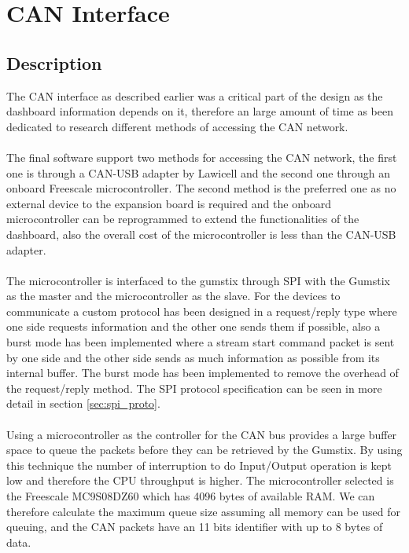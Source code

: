 \documentclass[11pt]{report} %
\begin{document}
	\section{CAN Interface}
		\subsection{Description}
		The CAN interface as described earlier was a critical part of the design as
		the dashboard information depends on it, therefore an large amount of time
		as been dedicated to research different methods of accessing the CAN 
		network.\\
		\\
		The final software support two methods for accessing the CAN network, the 
		first
		one is through a CAN-USB adapter by Lawicell and the second one through an
		onboard Freescale microcontroller. The second method is the preferred one  
		as
		no external device to the expansion board is required and the onboard
		microcontroller can be reprogrammed to extend the functionalities of the
		dashboard, also the overall cost of the microcontroller is less than the 
		CAN-USB adapter.\\
		\\
		The microcontroller is interfaced to the gumstix through SPI with the  
		Gumstix
		as the master and the microcontroller as the slave. For the devices to 
		communicate a custom protocol has been designed in a request/reply type
		where one side requests
		information and the other one sends them if possible, also a burst mode has
		been implemented where a stream start command packet is sent by one side  
		and
		the other side sends as much information as possible from its internal 
		buffer.
		The burst mode has been implemented to remove the overhead of the 
		request/reply method. The SPI protocol specification can be seen in more
		detail in section \ref{sec:spi_proto}.	\\
		\\
		Using a microcontroller as the controller for the CAN bus provides a large
		buffer space to queue the packets before they can be retrieved by the 
		Gumstix.
		By using this technique the number of interruption to do Input/Output 
		operation
		is kept low and therefore the CPU throughput is higher. The microcontroller
		selected is the Freescale MC9S08DZ60 which has 4096 bytes of available RAM.
		We can therefore calculate the maximum queue size assuming all memory can be used for 
		queuing,
		and the CAN packets have an 11 bits identifier with up to 8 bytes of data.
\end{document}
